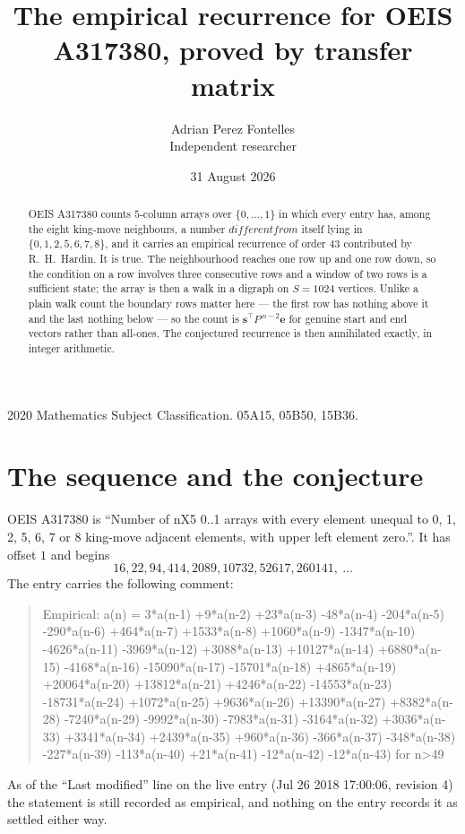 \documentclass[11pt,a4paper]{article}
\title{The empirical recurrence for OEIS A317380, proved by transfer matrix}
\author{Adrian Perez Fontelles\\ \small Independent researcher}
\date{31 August 2026}
\theoremstyle{plain}
\theoremstyle{definition}
\begin{document}
\maketitle

\begin{abstract}
OEIS A317380 counts $5$-column arrays over $\{0,\dots,1\}$ in which every entry has,
among the eight king-move neighbours, a number $different from$ itself lying in $\{0,1,2,5,6,7,8\}$, and it carries an empirical
recurrence of order $43$ contributed by R.~H.~Hardin. It is true. The neighbourhood
reaches one row up and one row down, so the condition on a row involves three consecutive
rows and a window of two rows is a sufficient state; the array is then a walk in a digraph
on $S=1024$ vertices. Unlike a plain walk count the boundary rows matter here --- the first
row has nothing above it and the last nothing below --- so the count is
$\mathbf{s}^{\!\top}P^{\,n-2}\mathbf{e}$ for genuine start and end vectors rather than
all-ones. The conjectured recurrence is then annihilated exactly, in integer arithmetic.
\end{abstract}

\noindent\small 2020 Mathematics Subject Classification. 05A15, 05B50, 15B36.\normalsize

\section{The sequence and the conjecture}

OEIS A317380 is ``Number of nX5 0..1 arrays with every element unequal to 0, 1, 2, 5, 6, 7 or 8 king-move adjacent elements, with upper left element zero.''. It has offset
$1$ and begins
\[
16, 22, 94, 414, 2089, 10732, 52617, 260141,\ \dots
\]
The entry carries the following comment:
\begin{quote}\small
Empirical: a(n) = 3*a(n-1) +9*a(n-2) +23*a(n-3) -48*a(n-4) -204*a(n-5) -290*a(n-6) +464*a(n-7) +1533*a(n-8) +1060*a(n-9) -1347*a(n-10) -4626*a(n-11) -3969*a(n-12) +3088*a(n-13) +10127*a(n-14) +6880*a(n-15) -4168*a(n-16) -15090*a(n-17) -15701*a(n-18) +4865*a(n-19) +20064*a(n-20) +13812*a(n-21) +4246*a(n-22) -14553*a(n-23) -18731*a(n-24) +1072*a(n-25) +9636*a(n-26) +13390*a(n-27) +8382*a(n-28) -7240*a(n-29) -9992*a(n-30) -7983*a(n-31) -3164*a(n-32) +3036*a(n-33) +3341*a(n-34) +2439*a(n-35) +960*a(n-36) -366*a(n-37) -348*a(n-38) -227*a(n-39) -113*a(n-40) +21*a(n-41) -12*a(n-42) -12*a(n-43) for n>49
\end{quote}
As of the ``Last modified'' line on the live entry (Jul 26 2018 17:00:06, revision
4) the statement is still recorded as empirical, and nothing on the entry
records it as settled either way.
\end{document}
